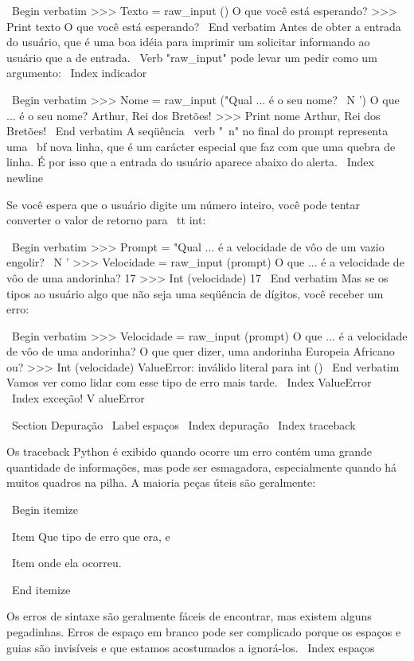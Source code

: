 \documentclass[10pt]{book}
\begin{document}
\begin {itemize}
{{{\ Begin {verbatim}
>>> Texto = raw_input ()
O que você está esperando?
>>> Print texto
O que você está esperando?
\ End {verbatim}
%
Antes de obter a entrada do usuário, que é uma boa idéia para imprimir um
solicitar informando ao usuário que a de entrada. \ Verb "raw_input" pode levar um
pedir como um argumento:
\ Index {indicador}

\ Begin {verbatim}
>>> Nome = raw_input ("Qual ... é o seu nome? \ N ')
O que ... é o seu nome?
Arthur, Rei dos Bretões!
>>> Print nome
Arthur, Rei dos Bretões!
\ End {verbatim}
%
A seqüência \ verb "\ n" no final do prompt representa uma {\ bf nova linha},
que é um carácter especial que faz com que uma quebra de linha.
É por isso que a entrada do usuário aparece abaixo do alerta.
\ Index {newline}

Se você espera que o usuário digite um número inteiro, você pode tentar converter
o valor de retorno para {\ tt int}:

\ Begin {verbatim}
>>> Prompt = "Qual ... é a velocidade de vôo de um vazio engolir? \ N '
>>> Velocidade = raw_input (prompt)
O que ... é a velocidade de vôo de uma andorinha?
17
>>> Int (velocidade)
17
\ End {verbatim}
%
Mas se os tipos ao usuário algo que não seja uma seqüência de dígitos,
você receber um erro:

\ Begin {verbatim}
>>> Velocidade = raw_input (prompt)
O que ... é a velocidade de vôo de uma andorinha?
O que quer dizer, uma andorinha Europeia Africano ou?
>>> Int (velocidade)
ValueError: inválido literal para int ()
\ End {verbatim}
%
Vamos ver como lidar com esse tipo de erro mais tarde.
\ Index {} ValueError
\ Index {exceção! V alueError}


\ Section {} Depuração
\ Label {espaços}
\ Index {depuração}
\ Index {} traceback

Os traceback Python é exibido quando ocorre um erro contém
uma grande quantidade de informações, mas pode ser esmagadora, especialmente
quando há muitos quadros na pilha. A maioria
peças úteis são geralmente:

\ Begin {itemize}

\ Item Que tipo de erro que era, e

\ Item onde ela ocorreu.

\ End {itemize}

Os erros de sintaxe são geralmente fáceis de encontrar, mas existem alguns
pegadinhas. Erros de espaço em branco pode ser complicado porque os espaços e
guias são invisíveis e que estamos acostumados a ignorá-los.
\ Index {espaços}

}}}
\end{itemize}
\end{document}
